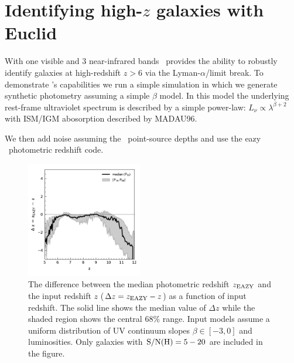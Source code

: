 

\section{Identifying high-$z$ galaxies with Euclid}

With one visible and 3 near-infrared bands \euclid\ provides the ability to robustly identify galaxies at high-redshift $z>6$ via the Lyman-$\alpha$/limit break. To demonstrate \euclid's capabilities we run a simple simulation in which we generate synthetic photometry assuming a simple $\beta$ model. In this model the underlying rest-frame ultraviolet spectrum is described by a simple power-law: $L_{\nu}\propto \lambda^{\beta+2}$ with ISM/IGM abosorption described by MADAU96.

We then add noise assuming the \euclid\ point-source depths and use the {\sc eazy} \insref\ photometric redshift code.



\begin{figure}
	\centering
	\includegraphics[width=0.45\textwidth]{./figures/beta/beta_dz.pdf}
	\caption{The difference between the median photometric redshift $z_{\rm EAZY}$ and the input redshift $z$ ($\Delta z = z_{\rm EAZY} - z$) as a function of input redshift. The solid line shows the median value of $\Delta z$ while the shaded region shows the central 68\% range. Input models assume a uniform distribution of UV continuum slopes $\beta\in[-3,0]$ and luminosities. Only galaxies with ${\rm S/N(H)}=5-20$ are included in the figure.\label{fig:beta_dz}}
\end{figure}

